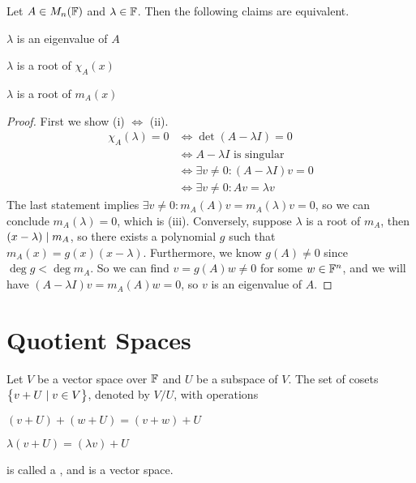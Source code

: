 \documentclass{styles/tufte}
\begin{document}
  \begin{theorem}{}{}
    Let $A \in M_n(\mathbb{F})$ and $\lambda \in \mathbb{F}$. Then the following claims are equivalent.
    \begin{romanenum}
      \item $\lambda$ is an eigenvalue of $A$
      \item $\lambda$ is a root of $\chi_A(x)$
      \item $\lambda$ is a root of $m_A(x)$
    \end{romanenum}
  \end{theorem}
  \begin{proof}
    First we show (i) $\iff$ (ii).
    \begin{align*}
      \chi_A(\lambda) = 0
      &\iff \det(A - \lambda I) = 0 \\
      &\iff A - \lambda I \text{ is singular} \\
      &\iff \exists v \neq 0: (A - \lambda I) v = 0 \\
      &\iff \exists v \neq 0: Av = \lambda v
    \end{align*}
    The last statement implies $\exists v \neq 0: m_A(A) v = m_A(\lambda) v = 0$, so we can conclude $m_A(\lambda) = 0$, which is (iii). Conversely, suppose $\lambda$ is a root of $m_A$, then $(x - \lambda) \mid m_A$, so there exists a polynomial $g$ such that $m_A(x) = g(x) (x - \lambda)$. Furthermore, we know $g(A) \neq 0$ since $\deg g < \deg m_A$. So we can find $v = g(A) w \neq 0$ for some $w \in \mathbb{F}^n$, and we will have $(A - \lambda I) v = m_A(A) w = 0$, so $v$ is an eigenvalue of $A$.
  \end{proof}





\section{Quotient Spaces}

\begin{definition}{}{}
  Let $V$ be a vector space over $\mathbb{F}$ and $U$ be a subspace of $V$. The set of cosets $\set{v + U \mid v \in V}$, denoted by $V/U$, with operations
  \begin{romanenum}
    \item $(v + U) + (w + U) = (v + w) + U$
    \item $\lambda (v + U) = (\lambda v) + U$
  \end{romanenum}
  is called a , and is a vector space.
\end{definition}
\end{document}
